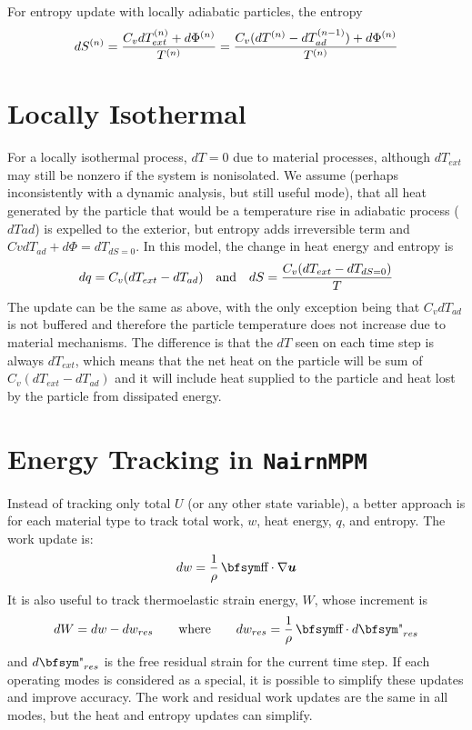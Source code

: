 \documentclass[11pt]{book}
\renewcommand{\vec}[1]{\boldsymbol{#1}}
\def\st{{\hbox{\bfsym\char'033}}}
\def\et{{\hbox{\bfsym\char'042}}}
\begin{document}
For entropy update with locally adiabatic particles, the entropy
\begin{equation}
    dS^{(n)} = {C_v dT_{ext}^{(n)}+d\Phi^{(n)}\over T^{(n)}} = {C_v (dT^{(n)}-dT_{ad}^{(n-1)})+d\Phi^{(n)}\over T^{(n)}}
\end{equation}


\section{Locally Isothermal}

For a locally isothermal process, $dT=0$ due to material processes, although $dT_{ext}$ may still be nonzero if the system is nonisolated. We assume (perhaps inconsistently with a dynamic analysis, but still useful mode), that all heat generated by the particle that would be a temperature rise in adiabatic process ($dTad$) is expelled to the exterior, but entropy adds irreversible term and $Cv dT_{ad}+d\Phi=dT_{dS=0}$. In this model, the change in heat energy and entropy is
\begin{equation}
     dq = C_v(dT_{ext}- dT_{ad}) \quad {\rm and}\quad  dS = {C_v (dT_{ext}-dT_{dS=0})\over T}
\end{equation}
The update can be the same as above, with the only exception being that $C_v dT_{ad}$ is not buffered and therefore the particle temperature does not increase due to material mechanisms. The difference is that the $dT$ seen on each time step is always $dT_{ext}$, which means that the net heat on the particle will be sum of $C_v(dT_{ext}-dT_{ad})$ and it will include heat supplied to the particle and heat lost by the particle from dissipated energy.

\section{Energy Tracking in {\tt NairnMPM}\label{EnergyUpdates}}

Instead of tracking only total $U$ (or any other state variable), a better approach is for each material type to track total work, $w$,  heat energy, $q$, and entropy. The work update is:
\begin{equation}
     dw = {1\over \rho}\thinspace \st\cdot \nabla\vec u
\end{equation}
It is also useful to track thermoelastic strain energy, $W$, whose increment is
\begin{equation}
     dW = dw - dw_{res} \qquad {\rm where} \qquad dw_{res} = {1\over \rho}\thinspace \st\cdot d\et_{res}
\end{equation}
and $d\et_{res}$ is the free residual strain for the current time step.
If each operating modes is considered as a special, it is possible to simplify these updates and improve accuracy. The work and residual work updates are the same in all modes, but the heat and entropy updates can simplify.
\end{document}
